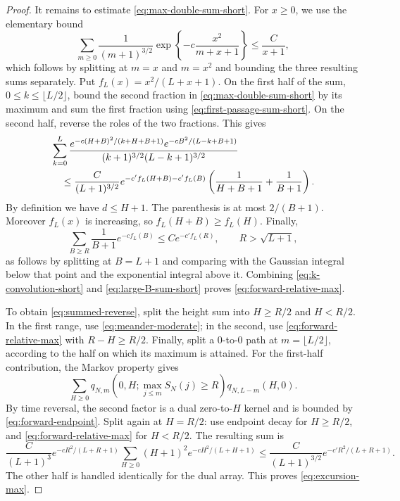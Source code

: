 \documentclass[11pt]{article}
\theoremstyle{plain}
\theoremstyle{definition}
\theoremstyle{remark}
\begin{document}
\begin{proof}
It remains to estimate \eqref{eq:max-double-sum-short}. For \(x\ge0\), we use the elementary bound
\begin{equation}
 \sum_{m\ge0}\frac1{(m+1)^{3/2}}
 \exp\left\{-c\frac{x^2}{m+x+1}\right\}
 \le \frac{C}{x+1},
 \label{eq:first-passage-sum-short}
\end{equation}
which follows by splitting at \(m=x\) and \(m=x^2\) and bounding the
three resulting sums separately.
Put \(f_L(x)=x^2/(L+x+1)\).  On the first half of the sum,
\(0\le k\le\lfloor L/2\rfloor\), bound the second fraction in
\eqref{eq:max-double-sum-short} by its maximum and sum the first fraction
using \eqref{eq:first-passage-sum-short}.  On the second half, reverse the
roles of the two fractions.  This gives
\begin{align}
 &\sum_{k=0}^{L}
 \frac{e^{-c(H+B)^2/(k+H+B+1)}
       e^{-cB^2/(L-k+B+1)}}
      {(k+1)^{3/2}(L-k+1)^{3/2}}\notag\\
 &\quad\le
 \frac{C}{(L+1)^{3/2}}
 e^{-c'f_L(H+B)-c'f_L(B)}
 \left(\frac1{H+B+1}+\frac1{B+1}\right).
 \label{eq:k-convolution-short}
\end{align}
By definition we have \(d\le H+1\). The parenthesis is
at most \(2/(B+1)\).  Moreover \(f_L(x)\) is increasing,
so 
\(f_L(H+B)\ge f_L(H)\).  Finally,
\begin{equation}
 \sum_{B\ge R}\frac1{B+1}e^{-c f_L(B)}
 \le C e^{-c'f_L(R)},
 \qquad R>\sqrt{L+1},
 \label{eq:large-B-sum-short}
\end{equation}
as follows by splitting at \(B=L+1\) and comparing with the Gaussian
integral below that point and the exponential integral above it.
Combining \eqref{eq:k-convolution-short} and \eqref{eq:large-B-sum-short} proves
\eqref{eq:forward-relative-max}.  



To obtain \eqref{eq:summed-reverse}, split the height sum into
\(H\ge R/2\) and \(H<R/2\). In the first range, use
\eqref{eq:meander-moderate}; in the second, use
\eqref{eq:forward-relative-max} with \(R-H\ge R/2\).
Finally, split a \(0\)-to-\(0\) path at
\(m=\lfloor L/2\rfloor\), according to the half on which its maximum is
attained.  For the first-half contribution, the Markov property gives
\[
 \sum_{H\ge0}q_{N,m}(0,H;\max_{j\le m}S_N(j)\ge R)
 q_{N,L-m}(H,0).
\]
By time reversal, the second factor is a dual zero-to-\(H\) kernel and
is bounded by \eqref{eq:forward-endpoint}.  Split again at \(H=R/2\):
use endpoint decay for \(H\ge R/2\), and
\eqref{eq:forward-relative-max} for \(H<R/2\).  The resulting sum is
\[
 \frac{C}{(L+1)^3}e^{-cR^2/(L+R+1)}
 \sum_{H\ge0}(H+1)^2e^{-cH^2/(L+H+1)}
 \le \frac{C}{(L+1)^{3/2}}e^{-c'R^2/(L+R+1)}.
\]
The other half is handled identically for the dual array.  This proves
\eqref{eq:excursion-max}.
\end{proof}
\end{document}
